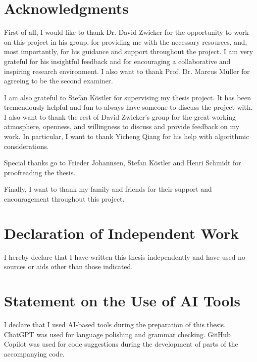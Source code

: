 \documentclass[12pt]{article}
\begin{document}
\section*{Acknowledgments}
First of all, I would like to thank Dr. David Zwicker for the opportunity to work on this project in his group, for providing me with the necessary resources,
and, most importantly, for his guidance and support throughout the project. I am very grateful for his insightful feedback and for encouraging a collaborative and inspiring research environment.
I also want to thank Prof. Dr. Marcus M\"uller for agreeing to be the second examiner.

I am also grateful to Stefan Köstler for supervising my thesis project. It has been tremendously helpful and fun to always have someone to discuss the project with. I also want to thank the rest of David Zwicker's group
for the great working atmosphere, openness, and willingness to discuss and provide feedback on my work. In particular, I want to thank Yicheng Qiang for his help with algorithmic considerations.

Special thanks go to Frieder Johannsen, Stefan Köstler and Henri Schmidt for proofreading the thesis.

Finally, I want to thank my family and friends for their support and encouragement throughout this project.\\



\clearpage


\clearpage

\section*{Declaration of Independent Work}
I hereby declare that I have written this thesis independently and have used no sources or aids other than those indicated.

\vspace{1cm}

\section*{Statement on the Use of AI Tools}

I declare that I used AI-based tools during the preparation of this thesis. ChatGPT was used for language polishing and grammar checking. GitHub Copilot was used for code suggestions during the development of parts of the accompanying code.
\end{document}
